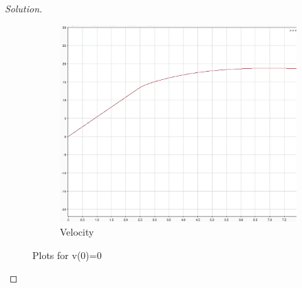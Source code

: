 \documentclass{article}
\begin{document}
\begin{proof}[Solution]
\begin{figure}[h!]
\begin{subfigure}{0.4\linewidth}
      \includegraphics[width=\linewidth]{img15.png}
      \caption{Velocity}
    \end{subfigure}
    \caption{Plots for v(0)=0}
\end{figure}


\end{proof}
\end{document}
